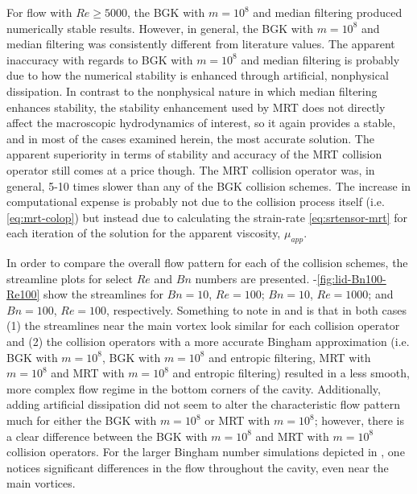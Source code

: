 For flow with $Re \ge 5000$, the BGK with $m = 10^8$ and median filtering produced numerically stable results.
However, in general, the BGK with $m = 10^8$ and median filtering was consistently different from literature values. 
The apparent inaccuracy with regards to BGK with $m = 10^8$ and median filtering is probably due to how the numerical stability is enhanced through artificial, nonphysical dissipation.
In contrast to the nonphysical nature in which median filtering enhances stability, the stability enhancement used by MRT does not directly affect the macroscopic hydrodynamics of interest, so it again provides a stable, and in most of the cases examined herein, the most accurate solution.
The apparent superiority in terms of stability and accuracy of the MRT collision operator still comes at a price though.
The MRT collision operator was, in general, 5-10 times slower than any of the BGK collision schemes.
The increase in computational expense is probably not due to the collision process itself (i.e. \eqref{eq:mrt-colop}) but instead due to calculating the strain-rate \eqref{eq:srtensor-mrt} for each iteration of the solution for the apparent viscosity, $\mu_{app}$.

In order to compare the overall flow pattern for each of the collision schemes, the streamline plots for select $Re$ and $Bn$ numbers are presented.
-\ref{fig:lid-Bn100-Re100} show the streamlines for $Bn = 10$, $Re = 100$; $Bn = 10$, $Re = 1000$; and $Bn = 100$, $Re = 100$, respectively.
Something to note in  and  is that in both cases (1) the streamlines near the main vortex look similar for each collision operator and (2) the collision operators with a more accurate Bingham approximation (i.e. BGK with $m = 10^8$, BGK with $m = 10^8$ and entropic filtering, MRT with $m = 10^8$ and MRT with $m = 10^8$ and entropic filtering) resulted in a less smooth, more complex flow regime in the bottom corners of the cavity.
Additionally, adding artificial dissipation did not seem to alter the characteristic flow pattern much for either the BGK with $m = 10^8$ or MRT with $m = 10^8$; however, there is a clear difference between the BGK with $m = 10^8$ and MRT with $m = 10^8$ collision operators.
For the larger Bingham number simulations depicted in , one notices significant differences in the flow throughout the cavity, even near the main vortices.


